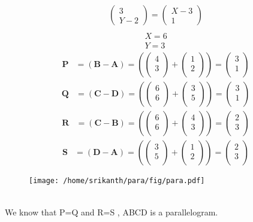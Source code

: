 \documentclass[12pt]{article}
\providecommand{\brak}[1]{\ensuremath{\left(#1\right)}}
\newcommand{\myvec}[1]{\ensuremath{\begin{pmatrix}#1\end{pmatrix}}}
\let\vec\mathbf
\begin{document}
 \begin{align} 
 \myvec{3\\Y-2}=\myvec{X-3\\1}\\
 \end{align}
 \begin{align} 
   X=6 \\ Y=3
 \end{align}
 \begin{align}
 \vec{P} &= \brak{\vec{B}-\vec{A}} = \brak{\myvec{
  4 \\
  3 \\
 } + \myvec{
  1 \\
  2\\
 } 
 } = \myvec{
 3\\
 1\\
 }  
 \end{align}
 \begin{align}
 \vec{Q} &= \brak{\vec{C}-\vec{D}} = \brak{\myvec{
  6 \\
  6 \\
 } + \myvec{
  3 \\
  5\\
 } 
 } = \myvec{
 3\\
 1\\
 }
 \end{align}
 \begin{align}
 \vec{R} &= \brak{\vec{C}-\vec{B}} = \brak{\myvec{
  6 \\
  6 \\
 } + \myvec{
  4 \\
  3\\
 } 
 } = \myvec{
 2\\
 3\\
 } 
 \end{align}
 \begin{align}
 \vec{S} &= \brak{\vec{D}-\vec{A}} = \brak{\myvec{
  3 \\
  5 \\
 } + \myvec{
  1 \\
  2\\
 } 
 } = \myvec{
 2\\
 3\\
 } 
\end{align}
\begin{figure}[h!]
	\begin{center}
  \texttt{[image: /home/srikanth/para/fig/para.pdf]}
	\end{center}
\caption{}
\label{fig:Fig3}
\end{figure}\\
We know that P=Q and R=S , ABCD is a parallelogram. 
\
\end{document}

